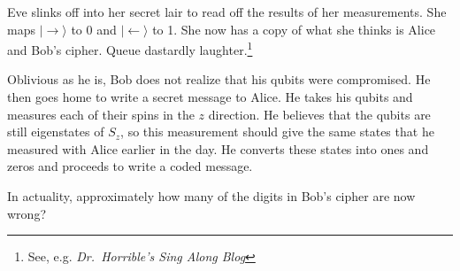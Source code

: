 \documentclass[12pt]{article}
\numberwithin{equation}{section}    %
\begin{document}
Eve slinks off into her secret lair to read off the results of her measurements. She maps $|\rightarrow\rangle$ to 0 and $|\leftarrow\rangle$ to 1. She now has a copy of what she thinks is Alice and Bob's cipher. Queue dastardly laughter.\footnote{See, e.g. \emph{Dr.\ Horrible's Sing Along Blog}}

Oblivious as he is, Bob does not realize that his qubits were compromised. He then goes home to write a secret message to Alice. He takes his qubits and measures each of their spins in the $z$ direction. He believes that the qubits are still eigenstates of $S_z$, so this measurement should give the same states that he measured with Alice earlier in the day. He converts these states into ones and zeros and proceeds to write a coded message.

In actuality, approximately how many of the digits in Bob's cipher are now wrong?
\end{document}
